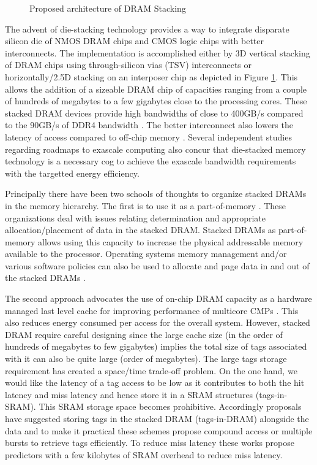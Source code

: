 \begin{figure}[!htb]
	\centering
	\def\svgwidth{\columnwidth}
	
	\caption{Proposed architecture of DRAM Stacking}
	\label{fig:stackdram}
\end{figure}
\par The advent of die-stacking technology \cite{3d-stacking} provides a way to integrate disparate silicon die of NMOS DRAM chips and CMOS logic chips with better interconnects. The implementation is accomplished either by 3D vertical stacking of DRAM chips using through-silicon vias (TSV) interconnects or horizontally/2.5D stacking on an interposer chip as depicted in Figure \ref{fig:stackdram}. This allows the addition of a sizeable DRAM chip of capacities ranging from a couple of hundreds of megabytes to a few gigabytes close to the processing cores. These stacked DRAM devices provide high bandwidths of close to 400GB/s compared to the 90GB/s of DDR4 bandwidth \cite{xeonphi}. The better interconnect also lowers the latency of access compared to off-chip memory \cite{alloy}. Several independent studies regarding roadmaps to exascale computing \cite{apu-exascale,amd-exascale1} also concur that die-stacked memory technology is a necessary cog to achieve the exascale bandwidth requirements with the targetted energy efficiency. 
\par Principally there have been two schools of thoughts to organize stacked DRAMs in the memory hierarchy. The first is to use it as a part-of-memory \cite{pom,cameo}. These organizations deal with issues relating determination and appropriate allocation/placement of data in the stacked DRAM. Stacked DRAMs as part-of-memory allows using this capacity to increase the physical addressable memory available to the processor. Operating systems memory management and/or various software policies can also be used to allocate and page data in and out of the stacked DRAMs \cite{software-dram}.
\par The second approach advocates the use of on-chip DRAM capacity as a hardware managed last level cache for improving performance of multicore CMPs \cite{alloy,bimodal,loh-hill,atcache,footprint}. This also reduces energy consumed per access for the overall system.
However, stacked DRAM require careful designing since the large cache size (in the order of hundreds of megabytes to few gigabytes) implies the total size of tags associated with it can also be quite large (order of megabytes). The large tags storage requirement has created a space/time trade-off problem. On the one hand, we would like the latency of a tag access to be low as it contributes to both the hit latency and miss latency and hence store it in a SRAM structures (tags-in-SRAM). This SRAM storage space becomes prohibitive. Accordingly proposals have suggested storing tags in the stacked DRAM (tags-in-DRAM) alongside the data and to make it practical these schemes propose compound access \cite{loh-hill} or multiple bursts \cite{alloy} to retrieve tags efficiently. To reduce miss latency these works propose predictors with a few kilobytes of SRAM overhead to reduce miss latency.




